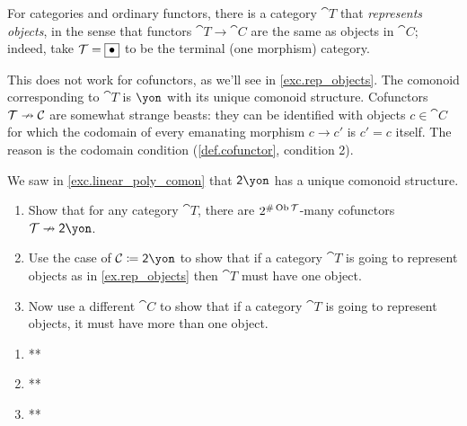 \documentclass[Book-Poly]{subfiles}
\begin{document}
\begin{example}\label{ex.rep_objects}
For categories and ordinary functors, there is a category $\cat{T}$ that \emph{represents objects}, in the sense that functors $\cat{T}\to\cat{C}$ are the same as objects in $\cat{C}$; indeed, take $\mathcal{T}=\fbox{$\bullet$}$ to be the terminal (one morphism) category.

This does not work for cofunctors, as we'll see in \cref{exc.rep_objects}. The comonoid corresponding to $\cat{T}$ is $\yon$ with its unique comonoid structure. Cofunctors $\mathcal{T}\nrightarrow\mathcal{C}$ are somewhat strange beasts: they can be identified with objects $c\in\cat{C}$ for which the codomain of every emanating morphism $c\to c'$ is $c'=c$ itself. The reason is the codomain condition (\cref{def.cofunctor}, condition 2).
\end{example}

\begin{exercise}\label{exc.rep_objects}
We saw in \cref{exc.linear_poly_comon} that $\2\yon$ has a unique comonoid structure.
\begin{enumerate}
	\item Show that for any category $\cat{T}$, there are $2^{\#\operatorname{Ob}\mathcal{T}}$-many cofunctors $\cat{T}\cof\2\yon$.
	\item Use the case of $\cat{C}\coloneqq\2\yon$ to show that if a category $\cat{T}$ is going to represent objects as in \cref{ex.rep_objects} then $\cat{T}$ must have one object.
	\item Now use a different $\cat{C}$ to show that if a category $\cat{T}$ is going to represent objects, it must have more than one object.
\qedhere
\end{enumerate}
\begin{solution}
\begin{enumerate}
    \item **
    \item **
    \item **
\end{enumerate}
\end{solution}
\end{exercise}
\end{document}

